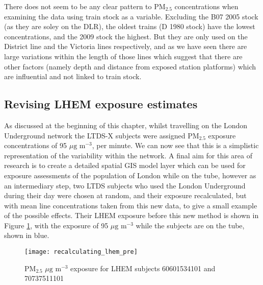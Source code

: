 There does not seem to be any clear pattern to PM$_{2.5}$ concentrations when examining the data using train stock as a variable. Excluding the B07 2005 stock (as they are soley on the DLR), the oldest trains (D 1980 stock) have the lowest concentrations, and the 2009 stock the highest. But they are only used on the District line and the Victoria lines respectively, and as we have seen there are large variations within the length of those lines which suggest that there are other factors (namely depth and distance from exposed station platforms) which are influential and not linked to train stock.

\subsection{Revising LHEM exposure estimates}
\label{subset:revising_lhem_exposure}
As discussed at the beginning of this chapter, whilst travelling on the London Underground network the LTDS-X subjects were assigned PM$_{2.5}$ exposure concentrations of 95 $\mu \text{g m}^{-3}$, per minute. We can now see that this is a simplistic representation of the variability within the network. A final aim for this area of research is to create a detailed spatial GIS model layer which can be used for exposure assessments of the population of London while on the tube, however as an intermediary step, two LTDS subjects who used the London Underground during their day were chosen at random, and their exposure recalculated, but with mean line concentrations taken from this new data, to give a small example of the possible effects. Their LHEM exposure before this new method is shown in Figure \ref{fig:lhem_exposure_timeline}, with the exposure of 95 $\mu \text{g m}^{-3}$ while the subjects are on the tube, shown in blue.

\begin{figure}[H]
\centering
\texttt{[image: recalculating\_lhem\_pre]}
\caption{PM$_{2.5}$ $\mu \text{g m}^{-3}$ exposure for LHEM subjects 60601534101 and 70737511101}
\label{fig:lhem_exposure_timeline}
\end{figure}

